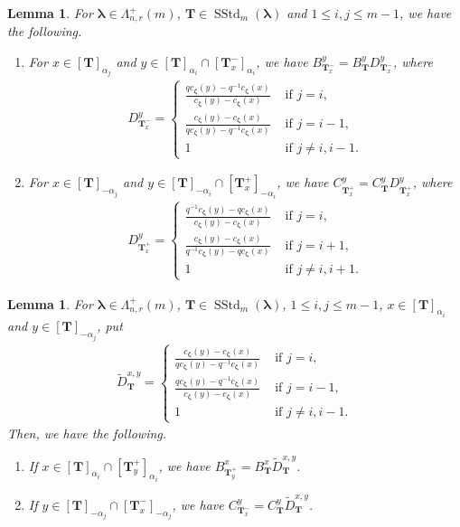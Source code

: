 \documentclass[12pt]{amsart}
\newtheorem{lem}[thm]{Lemma}
\numberwithin{equation}{thm}
\newcommand\bT{\mathbf T}
\renewcommand\a{\alpha}  %
\newcommand\vL{\varLambda}
\newcommand\Bz{\boldsymbol\zeta}
\newcommand\Bla{\boldsymbol\lambda}
\newcommand{\dis}{\displaystyle}
\newcommand\wt{\widetilde}
\newcommand{\SStd}{\operatorname{SStd}}
\begin{document}
\begin{lem}
\label{Lemma BbTx- y} 
For $\Bla \in \vL_{n,r}^+(m)$, $\bT \in \SStd_m(\Bla)$ and $1 \leq i,j \leq m-1$, 
we have the following. 
\begin{enumerate} 
\item 
For $x \in [\bT]_{\a_j}$ and $y \in [\bT]_{\a_i} \cap [\bT_x^-]_{\a_i}$,  
we have $B_{\bT_x^-}^y = B_{\bT}^y D_{\bT_x^-}^y$, 
where 
\begin{align*}
D_{\bT_x^-}^y = \begin{cases}
	\dis \frac{ q c_{\Bz} (y) - q^{-1} c_{\Bz} (x) }{ c_{\Bz} (y) - c_{\Bz} (x)} 
		& \text{ if } j=i,  
	\\[1em] 
	\dis \frac{c_{\Bz} (y) - c_{\Bz} (x)}{ q c_{\Bz} (y) - q^{-1} c_{\Bz} (x)} 
		& \text{ if } j= i-1, 
	\\[1em] 
	1 & \text{ if } j \not= i, i-1.
	\end{cases}
\end{align*}

\item 
For $x \in [\bT]_{-\a_j}$ and $y \in [\bT]_{-\a_i} \cap [\bT_x^+]_{-\a_i}$, 
we have  $C_{\bT_x^+}^y = C_{\bT}^y D_{\bT_x^+}^y$, 
where 
\begin{align*}
D_{\bT_x^+}^y 
= \begin{cases}
	\dis \frac{q^{-1} c_{\Bz} (y) - q c_{\Bz} (x)}{ c_{\Bz}(y) - c_{\Bz} (x)} 
		& \text{ if } j=i, 
	\\[1em] 
	\dis \frac{ c_{\Bz} (y) - c_{\Bz} (x)}{ q^{-1} c_{\Bz} (y) - q c_{\Bz} (x) } 
		& \text{ if } j=i+1, 
	\\[1em] 
	1 & \text{ if } j \not=i, i+1.
\end{cases}
\end{align*}
\end{enumerate}
\end{lem} 

\begin{lem} 
\label{Lemma wtDbTxy}
For $\Bla \in \vL_{n,r}^+(m)$, $\bT \in \SStd_m(\Bla)$, $1 \leq i,j \leq m-1$, 
$x \in [\bT]_{\a_i}$ and $y \in [\bT]_{- \a_j}$, 
put 
\begin{align*}
\wt{D}_{\bT}^{x,y} 
	= \begin{cases}
		\dis \frac{ c_{\Bz} (y) - c_{\Bz} (x)}{ q c_{\Bz} (y) - q^{-1} c_{\Bz} (x)} 
			& \text{ if } j=i, 
		\\[1em] 
		\dis \frac{ q c_{\Bz} (y) - q^{-1} c_{\Bz} (x)}{ c_{\Bz}(y) - c_{\Bz} (x)} 
			& \text{ if } j=i-1, 
		\\[1em] 
		1 & \text{ if } j \not=i, i-1.
	\end{cases}
\end{align*} 
Then, we have the following.  
\begin{enumerate} 
\item 
If $x \in [\bT]_{\a_i} \cap [\bT_y^+]_{\a_i}$, 
	we have $B_{\bT_y^+}^x = B_{\bT}^x \wt{D}_{\bT}^{x,y}$. 

\item 
If $ y \in [\bT]_{-\a_j} \cap [\bT_x^-]_{-\a_j}$, 
	we have $C_{\bT_x^-}^y =C_{\bT}^y \wt{D}_{\bT}^{x,y}$. 
\end{enumerate} 
\end{lem}
\end{document}
